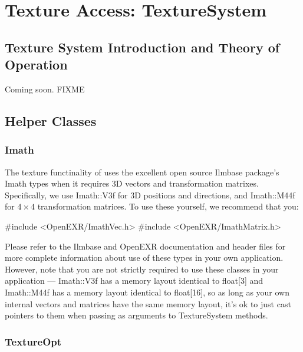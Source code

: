 \chapter{Texture Access: {\cf TextureSystem}}
\label{chap:texturesystem}

\def\TextureSystem{{\kw TextureSystem}\xspace}
\def\TextureOptions{{\kw TextureOptions}\xspace}
\def\TextureOpt{{\kw TextureOpt}\xspace}


\section{Texture System Introduction and Theory of Operation}
\label{sec:texturesys:intro}

Coming soon.
FIXME

\section{Helper Classes}
\label{sec:texturesys:helperclasses}

\subsection{Imath}

The texture functinality of \product uses the excellent open source
{\cf Ilmbase} package's {\cf Imath} types when it requires 3D vectors
and transformation matrixes.  Specifically, we use {\cf Imath::V3f}
for 3D positions and directions, and {\cf Imath::M44f} for $4 \times 4$
transformation matrices.  To use these yourself, we recommend that you:

\begin{code}
    #include <OpenEXR/ImathVec.h>
    #include <OpenEXR/ImathMatrix.h>
\end{code}

Please refer to the {\cf Ilmbase} and {\cf OpenEXR}
documentation and header files for more complete information about
use of these types in your own application.  However, note that you
are not strictly required to use these classes in your application ---
{\cf Imath::V3f} has a memory layout identical to {\cf float[3]}
and {\cf Imath::M44f} has a memory layout identical to {\cf float[16]},
so as long as your own internal vectors and matrices have the same
memory layout, it's ok to just cast pointers to them when passing
as arguments to \TextureSystem methods.


\subsection{\TextureOpt}

